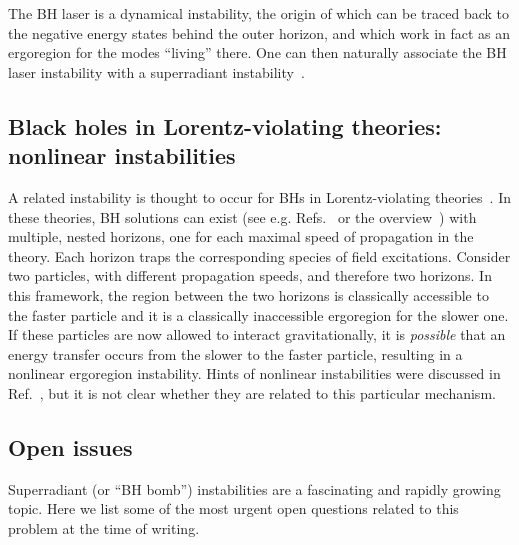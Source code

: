 \documentclass[11pt]{article}
\numberwithin{equation}{section} %
\begin{document}
The BH laser is a dynamical instability, the origin of which can be traced back to the 
negative energy states behind the outer horizon, and which work in fact as an ergoregion for 
the modes ``living'' there. One can then naturally associate the BH laser instability with a superradiant
instability~\cite{Coutant:2009cu,Coutant:2014wga}. 


\subsection{Black holes in Lorentz-violating theories: nonlinear instabilities}\label{sec:BH_Lorentz_violating}
A related instability is thought to occur for BHs in Lorentz-violating theories~\cite{Eling:2007qd,Blas:2011ni}.
In these theories, BH solutions can exist (see e.g. Refs.~\cite{Giannios:2005es,Eling:2006ec,Barausse:2013nwa} or the overview~\cite{Berti:2015itd}) with multiple, nested horizons, one for each maximal speed of propagation in the
theory. Each horizon traps the corresponding species of
field excitations. Consider two particles, with different propagation speeds, and therefore two horizons.
In this framework, the region between the two horizons
is classically accessible to the faster particle and it is a classically inaccessible ergoregion for the slower one.
If these particles are now allowed to interact gravitationally, it is {\it possible}
that an energy transfer occurs from the slower to the faster particle, resulting in a nonlinear ergoregion instability.
Hints of nonlinear instabilities were discussed in Ref.~\cite{Blas:2011ni}, but it is not clear whether they are related to
this particular mechanism.


\subsection{Open issues}
Superradiant (or ``BH bomb'') instabilities are a fascinating and rapidly growing topic. Here we list some of the most 
urgent open questions related to this problem at the time of writing.
\end{document}

